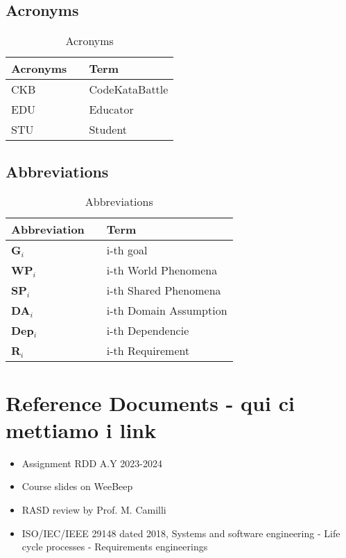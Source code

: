 \subsection{Acronyms}
\begin{table}[H]
    \centering
    \renewcommand{\arraystretch}{1.5}
    \begin{tabular}{l l p{11cm}}
        \hline
        \textbf{Acronyms} &  & \textbf{Term}  \\
        \hline
        CKB               &  & CodeKataBattle \\
        EDU               &  & Educator       \\
        STU               &  & Student        \\
        \hline
    \end{tabular}
    \caption{Acronyms}
\end{table}

\subsection{Abbreviations}
\begin{table}[H]
    \centering
    \renewcommand{\arraystretch}{1.5}
    \begin{tabular}{l l p{10.5cm}}
        \hline
        \textbf{Abbreviation} &  & \textbf{Term}          \\
        \hline
        \textbf{G}\(_i\)      &  & i-th goal              \\
        \textbf{WP}\(_i\)     &  & i-th World Phenomena   \\
        \textbf{SP}\(_i\)     &  & i-th Shared Phenomena  \\
        \textbf{DA}\(_i\)     &  & i-th Domain Assumption \\
        \textbf{Dep}\(_i\)    &  & i-th Dependencie       \\
        \textbf{R}\(_i\)      &  & i-th Requirement       \\
        \hline
    \end{tabular}
    \caption{Abbreviations}
\end{table}

{\color{red}\section{Reference Documents - qui ci mettiamo i link}}
\begin{itemize}
    \item Assignment RDD A.Y 2023-2024
    \item Course slides on WeeBeep
    \item RASD review by Prof. M. Camilli
    \item ISO/IEC/IEEE 29148 dated 2018, Systems and software engineering - Life cycle processes - Requirements engineerings
\end{itemize}

